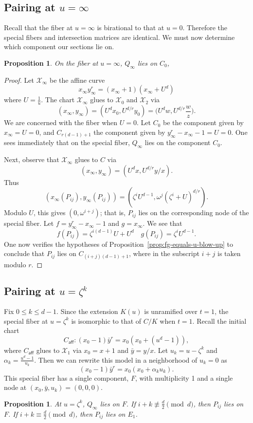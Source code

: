 \documentclass[pagesize,paper=letter]{scrartcl}
\newtheorem{proposition}[thm]{Proposition}
\theoremstyle{definition}
\theoremstyle{remark}
\def\caff{C_{\textsf{aff}}}
\def\sX{\mathcal{X}}
\newcommand{\sxi}{\mathcal{X}_\infty}
\begin{document}
\subsection{Pairing at $u=\infty$}
\label{sec:pairing-at-u=infty}

Recall that the fiber at $u=\infty$ is birational to that at $u=0$. Therefore the special fibers and intersection matrices are identical. We must now determine which component our sections lie on.
\begin{proposition}
  On the fiber at $u=\infty$, $Q_\infty$ lies on $C_0$, 
\end{proposition}

\begin{proof}
  Let $\sxi$ be the affine curve
  \[
  x_\infty y_\infty^r = (x_\infty + 1)(x_\infty + {U^d})
  \]
  where $U = \frac{1}{u}$. The chart $\sxi$ glues to $\sX_0$ and $\sX_2$ via 
  \[
  (x_\infty, y_\infty) = (U^d x_0, U^{d/r} y_0) = \bigg(U^d w, U^{d/r} \frac{w}{z}\bigg).
  \]
  We are concerned with the fiber when $U = 0$. Let $C_0$ be the component given by $x_\infty = U = 0$, and $C_{r(d-1)+1}$ the component given by $y_\infty^r - x_\infty - 1 = U = 0$. One sees immediately that on the special fiber, $Q_\infty$ lies on the component $C_0$.

  Next, observe that $\sxi$ glues to $C$ via
  \[
  (x_\infty, y_\infty) = (U^d x, U^{d/r} y/x).
  \]
  Thus
  \[
  (x_\infty(P_{ij}), y_\infty(P_{ij})) = (\zeta^i U^{d-1}, \omega^j (\zeta^i + U)^{d/r}).
  \]
  Modulo $U$, this gives $(0,\omega^{i+j})$; that is, $P_{ij}$ lies on the corresponding node of the special fiber. Let $f = y_\infty^r - x_\infty - 1$ and $g = x_\infty$. We see that 
  \[
  f(P_{ij}) = \zeta^{i(d-1)} U + U^d \quad g(P_{ij}) = \zeta^i U^{d-1}.
  \]
  One now verifies the hypotheses of Proposition~\ref{prop:fg-equals-u-blow-up} to conclude that $P_{ij}$ lies on $C_{(i+j)(d-1) +1}$, where in the subscript $i+j$ is taken modulo $r$.
\end{proof}

\subsection{Pairing at $u = \zeta^k$}
\label{sec:pairing-at-u-1}

Fix $0 \leq k \leq d-1$. Since the extension $K(u)$ is unramified over $t = 1$, the special fiber at $u = \zeta^k$ is isomorphic to that of $C/K$ when $t = 1$. Recall the initial chart 
\[
\caff: (x_0 - 1) \bar{y}^r = x_0(x_0 + (u^d - 1)),
\]
where $\caff$ glues to $\sX_1$ via $x_0 = x + 1$ and $\bar{y} = y/x$. Let $u_k = u - \zeta^k$ and $\alpha_k = \frac{u^d - 1}{u_k}$. Then we can rewrite this model in a neighborhood of $u_k = 0$ as
\[
(x_0 - 1) \bar{y}^r = x_0(x_0 + \alpha_ku_k).
\]
This special fiber has a single component, $F$, with multiplicity 1 and a single node at $(x_0, \bar{y}, u_k) = (0,0,0)$.
\begin{proposition}
  At $u=\zeta^k$, $Q_\infty$ lies on $F$. If $i+k \not\equiv \frac{d}{2} \pmod{d}$, then $P_{ij}$ lies on $F$. If $i + k \equiv \frac{d}{2} \pmod{d}$, then $P_{ij}$ lies on $E_1$.
\end{proposition}
\end{document}
